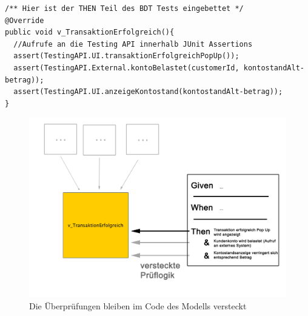 \begin{lstlisting}[caption=Überprüfungen mittels Testing API in Blattknoten, label=lst:mbt_bdt_assertion]
/** Hier ist der THEN Teil des BDT Tests eingebettet */
@Override
public void v_TransaktionErfolgreich(){
  //Aufrufe an die Testing API innerhalb JUnit Assertions
  assert(TestingAPI.UI.transaktionErfolgreichPopUp());
  assert(TestingAPI.External.kontoBelastet(customerId, kontostandAlt-betrag));
  assert(TestingAPI.UI.anzeigeKontostand(kontostandAlt-betrag));
}
\end{lstlisting}


\begin{figure} 
  \centering
     \includegraphics[width=1\textwidth]{figures/mbt_bdt_then.png}
  \caption{Die Überprüfungen bleiben im Code des Modells versteckt}
  \label{fig:mbt_bdt_then}
\end{figure}

